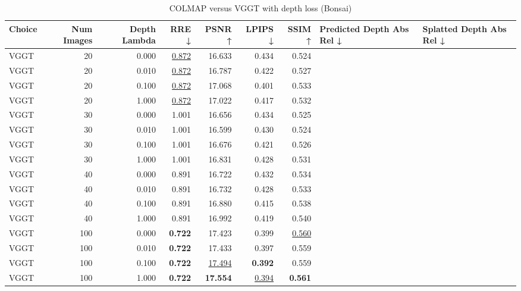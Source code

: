 \begin{table}[H]
\caption{COLMAP versus VGGT with depth loss (Bonsai)}
\label{tab:05_depth_lambda_num_images_bonsai}
\small
\begin{tabular}{lrrrrrrll}
\toprule
Choice & Num Images & Depth Lambda & RRE ↓ & PSNR ↑ & LPIPS ↓ & SSIM ↑ & Predicted Depth Abs Rel ↓ & Splatted Depth Abs Rel ↓ \\
\midrule
VGGT & 20 & 0.000 & \underline{0.872} & 16.633 & 0.434 & 0.524 &  &  \\
VGGT & 20 & 0.010 & \underline{0.872} & 16.787 & 0.422 & 0.527 &  &  \\
VGGT & 20 & 0.100 & \underline{0.872} & 17.068 & 0.401 & 0.533 &  &  \\
VGGT & 20 & 1.000 & \underline{0.872} & 17.022 & 0.417 & 0.532 &  &  \\
VGGT & 30 & 0.000 & 1.001 & 16.656 & 0.434 & 0.525 &  &  \\
VGGT & 30 & 0.010 & 1.001 & 16.599 & 0.430 & 0.524 &  &  \\
VGGT & 30 & 0.100 & 1.001 & 16.676 & 0.421 & 0.526 &  &  \\
VGGT & 30 & 1.000 & 1.001 & 16.831 & 0.428 & 0.531 &  &  \\
VGGT & 40 & 0.000 & 0.891 & 16.722 & 0.432 & 0.534 &  &  \\
VGGT & 40 & 0.010 & 0.891 & 16.732 & 0.428 & 0.533 &  &  \\
VGGT & 40 & 0.100 & 0.891 & 16.880 & 0.415 & 0.538 &  &  \\
VGGT & 40 & 1.000 & 0.891 & 16.992 & 0.419 & 0.540 &  &  \\
VGGT & 100 & 0.000 & \textbf{0.722} & 17.423 & 0.399 & \underline{0.560} &  &  \\
VGGT & 100 & 0.010 & \textbf{0.722} & 17.433 & 0.397 & 0.559 &  &  \\
VGGT & 100 & 0.100 & \textbf{0.722} & \underline{17.494} & \textbf{0.392} & 0.559 &  &  \\
VGGT & 100 & 1.000 & \textbf{0.722} & \textbf{17.554} & \underline{0.394} & \textbf{0.561} &  &  \\
\bottomrule
\end{tabular}
\end{table}